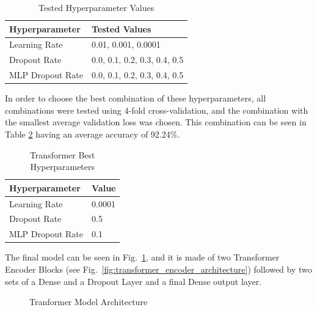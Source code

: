 \begin{table}[H]
    \centering
    \caption{Tested Hyperparameter Values}
    \label{table:transformer_hyperparameters}
    \begin{tabular}{|l|l|}
        \hline
        Hyperparameter & Tested Values \\
        \hline
        Learning Rate & 0.01, 0.001, 0.0001 \\
        \hline
        Dropout Rate & 0.0, 0.1, 0.2, 0.3, 0.4, 0.5 \\
        \hline
        MLP Dropout Rate & 0.0, 0.1, 0.2, 0.3, 0.4, 0.5 \\
        \hline
    \end{tabular}
\end{table}

In order to choose the best combination of these hyperparameters, all combinations were
tested using 4-fold cross-validation, and the combination with the smallest average validation loss was chosen. This combination can be seen in Table \ref{table:transformer_best_hyperparameters}
having an average accuracy of 92.24\%.

\begin{table}[H]
    \centering
    \caption{Transformer Best Hyperparameters}
    \label{table:transformer_best_hyperparameters}
    \begin{tabular}{|l|l|}
        \hline
        Hyperparameter & Value \\
        \hline
        Learning Rate & 0.0001 \\
        \hline
        Dropout Rate & 0.5 \\
        \hline
        MLP Dropout Rate & 0.1 \\
        \hline
    \end{tabular}
\end{table}

The final model can be seen in Fig.~\ref{fig:transformer_architecture}, and it is made of two Transformer Encoder Blocks (see Fig.~\ref{fig:transformer_encoder_architecture}) followed by two sets of a Dense and a Dropout Layer and a final Dense output layer.

\begin{figure}[H]
    \centering
    {\fontsize{10}{12}\selectfont}
    \caption[Tranformer Model Architecture]{Tranformer Model Architecture}
    \label{fig:transformer_architecture}
\end{figure}

